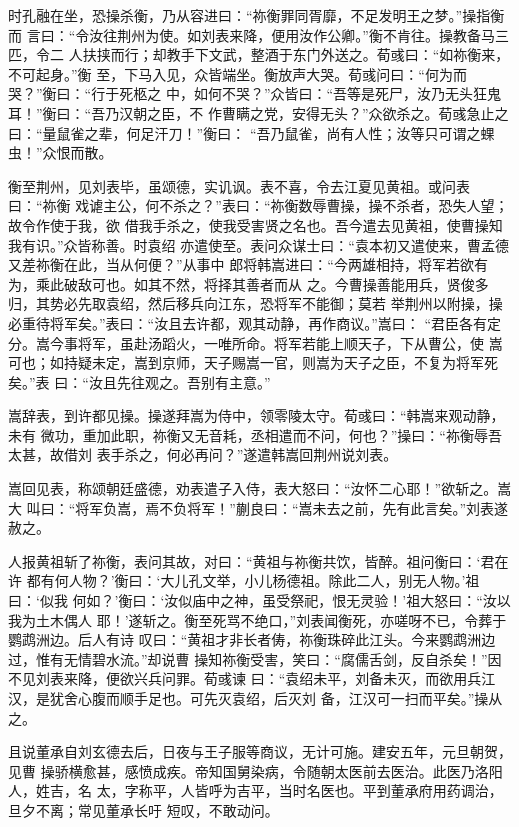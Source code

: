 时孔融在坐，恐操杀衡，乃从容进曰：“祢衡罪同胥靡，不足发明王之梦。”操指衡而
言曰：“令汝往荆州为使。如刘表来降，便用汝作公卿。”衡不肯往。操教备马三匹，令二
人扶挟而行；却教手下文武，整酒于东门外送之。荀彧曰：“如祢衡来，不可起身。”衡
至，下马入见，众皆端坐。衡放声大哭。荀彧问曰：“何为而哭？”衡曰：“行于死柩之
中，如何不哭？”众皆曰：“吾等是死尸，汝乃无头狂鬼耳！”衡曰：“吾乃汉朝之臣，不
作曹瞒之党，安得无头？”众欲杀之。荀彧急止之曰：“量鼠雀之辈，何足汗刀！”衡曰：
“吾乃鼠雀，尚有人性；汝等只可谓之蜾虫！”众恨而散。

衡至荆州，见刘表毕，虽颂德，实讥讽。表不喜，令去江夏见黄祖。或问表曰：“祢衡
戏谑主公，何不杀之？”表曰：“祢衡数辱曹操，操不杀者，恐失人望；故令作使于我，欲
借我手杀之，使我受害贤之名也。吾今遣去见黄祖，使曹操知我有识。”众皆称善。时袁绍
亦遣使至。表问众谋士曰：“袁本初又遣使来，曹孟德又差祢衡在此，当从何便？”从事中
郎将韩嵩进曰：“今两雄相持，将军若欲有为，乘此破敌可也。如其不然，将择其善者而从
之。今曹操善能用兵，贤俊多归，其势必先取袁绍，然后移兵向江东，恐将军不能御；莫若
举荆州以附操，操必重待将军矣。”表曰：“汝且去许都，观其动静，再作商议。”嵩曰：
“君臣各有定分。嵩今事将军，虽赴汤蹈火，一唯所命。将军若能上顺天子，下从曹公，使
嵩可也；如持疑未定，嵩到京师，天子赐嵩一官，则嵩为天子之臣，不复为将军死矣。”表
曰：“汝且先往观之。吾别有主意。”

嵩辞表，到许都见操。操遂拜嵩为侍中，领零陵太守。荀彧曰：“韩嵩来观动静，未有
微功，重加此职，祢衡又无音耗，丞相遣而不问，何也？”操曰：“祢衡辱吾太甚，故借刘
表手杀之，何必再问？”遂遣韩嵩回荆州说刘表。

嵩回见表，称颂朝廷盛德，劝表遣子入侍，表大怒曰：“汝怀二心耶！”欲斩之。嵩大
叫曰：“将军负嵩，焉不负将军！”蒯良曰：“嵩未去之前，先有此言矣。”刘表遂赦之。

人报黄祖斩了祢衡，表问其故，对曰：“黄祖与祢衡共饮，皆醉。祖问衡曰：‘君在许
都有何人物？’衡曰：‘大儿孔文举，小儿杨德祖。除此二人，别无人物。’祖曰：‘似我
何如？’衡曰：‘汝似庙中之神，虽受祭祀，恨无灵验！’祖大怒曰：“汝以我为土木偶人
耶！’遂斩之。衡至死骂不绝口，”刘表闻衡死，亦嗟呀不已，令葬于鹦鹉洲边。后人有诗
叹曰：“黄祖才非长者俦，祢衡珠碎此江头。今来鹦鹉洲边过，惟有无情碧水流。”却说曹
操知祢衡受害，笑曰：“腐儒舌剑，反自杀矣！”因不见刘表来降，便欲兴兵问罪。荀彧谏
曰：“袁绍未平，刘备未灭，而欲用兵江汉，是犹舍心腹而顺手足也。可先灭袁绍，后灭刘
备，江汉可一扫而平矣。”操从之。

且说董承自刘玄德去后，日夜与王子服等商议，无计可施。建安五年，元旦朝贺，见曹
操骄横愈甚，感愤成疾。帝知国舅染病，令随朝太医前去医治。此医乃洛阳人，姓吉，名
太，字称平，人皆呼为吉平，当时名医也。平到董承府用药调治，旦夕不离；常见董承长吁
短叹，不敢动问。


